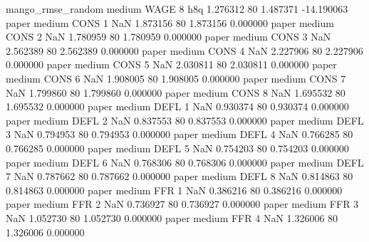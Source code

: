 mango_rmse_random     medium     WAGE                 8                  h8q  1.276312 80       1.487371         -14.190063
            paper     medium     CONS                 1                  NaN  1.873156 80       1.873156           0.000000
            paper     medium     CONS                 2                  NaN  1.780959 80       1.780959           0.000000
            paper     medium     CONS                 3                  NaN  2.562389 80       2.562389           0.000000
            paper     medium     CONS                 4                  NaN  2.227906 80       2.227906           0.000000
            paper     medium     CONS                 5                  NaN  2.030811 80       2.030811           0.000000
            paper     medium     CONS                 6                  NaN  1.908005 80       1.908005           0.000000
            paper     medium     CONS                 7                  NaN  1.799860 80       1.799860           0.000000
            paper     medium     CONS                 8                  NaN  1.695532 80       1.695532           0.000000
            paper     medium     DEFL                 1                  NaN  0.930374 80       0.930374           0.000000
            paper     medium     DEFL                 2                  NaN  0.837553 80       0.837553           0.000000
            paper     medium     DEFL                 3                  NaN  0.794953 80       0.794953           0.000000
            paper     medium     DEFL                 4                  NaN  0.766285 80       0.766285           0.000000
            paper     medium     DEFL                 5                  NaN  0.754203 80       0.754203           0.000000
            paper     medium     DEFL                 6                  NaN  0.768306 80       0.768306           0.000000
            paper     medium     DEFL                 7                  NaN  0.787662 80       0.787662           0.000000
            paper     medium     DEFL                 8                  NaN  0.814863 80       0.814863           0.000000
            paper     medium      FFR                 1                  NaN  0.386216 80       0.386216           0.000000
            paper     medium      FFR                 2                  NaN  0.736927 80       0.736927           0.000000
            paper     medium      FFR                 3                  NaN  1.052730 80       1.052730           0.000000
            paper     medium      FFR                 4                  NaN  1.326006 80       1.326006           0.000000
